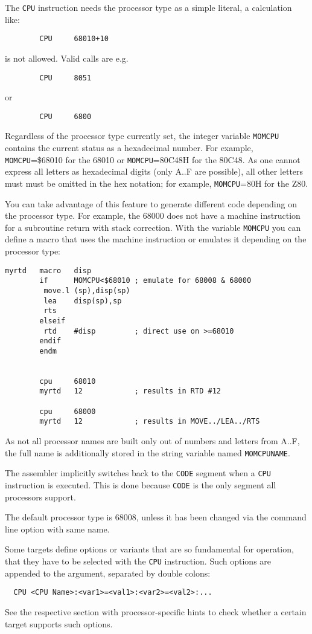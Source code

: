 \documentclass[12pt,twoside]{report}
\newcommand{\tty}[1]{{\tt #1}}
\begin{document}
The \tty{CPU} instruction needs the processor type as a simple literal, a
calculation like:
\begin{verbatim}
        CPU     68010+10
\end{verbatim}
is not allowed.  Valid calls are e.g.
\begin{verbatim}
        CPU     8051
\end{verbatim}
or
\begin{verbatim}
        CPU     6800
\end{verbatim}
Regardless of the processor type currently set, the integer variable
\tty{MOMCPU} contains the current status as a hexadecimal number.  For
example, \tty{MOMCPU}=\$68010 for the 68010 or \tty{MOMCPU}=80C48H for the
80C48.  As one cannot express all letters as hexadecimal digits (only A..F
are possible), all other letters must must be omitted in the hex notation;
for example, \tty{MOMCPU}=80H for the Z80.

You can take advantage of this feature to generate different code
depending on the processor type.  For example, the 68000 does not have a
machine instruction for a subroutine return with stack correction.  With
the variable \tty{MOMCPU} you can define a macro that uses the machine
instruction or emulates it depending on the processor type:
\begin{verbatim}
myrtd   macro   disp
        if      MOMCPU<$68010 ; emulate for 68008 & 68000
         move.l (sp),disp(sp)
         lea    disp(sp),sp
         rts
        elseif
         rtd    #disp         ; direct use on >=68010
        endif
        endm


        cpu     68010
        myrtd   12            ; results in RTD #12

        cpu     68000
        myrtd   12            ; results in MOVE../LEA../RTS
\end{verbatim}
As not all processor names are built only out of numbers and letters
from A..F, the full name is additionally stored in the string
variable named \tty{MOMCPUNAME}.

The assembler implicitly switches back to the \tty{CODE} segment when a
\tty{CPU} instruction is executed.  This is done because \tty{CODE} is the
only segment all processors support.

The default processor type is 68008, unless it has been changed via the
command line option with same name.

Some targets define options or variants that are so fundamental for
operation, that they have to be selected with the \tty{CPU} instruction.
Such options are appended to the argument, separated by double
colons:
\begin{verbatim}
  CPU <CPU Name>:<var1>=<val1>:<var2>=<val2>:...
\end{verbatim}
See the respective section with processor-specific hints to check whether a
certain target supports such options.
\end{document}
